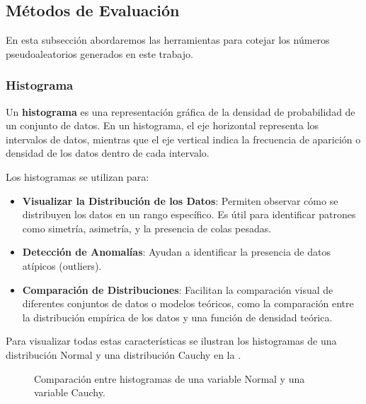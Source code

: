 \documentclass[../Main.tex]{subfiles}
\begin{document}
\subsection{Métodos de Evaluación }

En esta subsección abordaremos las herramientas para cotejar los números pseudoaleatorios generados en este trabajo.
\subsubsection{Histograma}

Un \textbf{histograma} es una representación gráfica de la densidad de probabilidad de un conjunto de datos. En un histograma, el eje horizontal representa los intervalos de datos, mientras que el eje vertical indica la frecuencia de aparición o densidad de los datos dentro de cada intervalo.

Los histogramas se utilizan para:

\begin{itemize}
    \item \textbf{Visualizar la Distribución de los Datos}: Permiten observar cómo se distribuyen los datos en un rango específico. Es útil para identificar patrones como simetría, asimetría, y la presencia de colas pesadas.
    \item \textbf{Detección de Anomalías}: Ayudan a identificar la presencia de datos atípicos (outliers).
    \item \textbf{Comparación de Distribuciones}: Facilitan la comparación visual de diferentes conjuntos de datos o modelos teóricos, como la comparación entre la distribución empírica de los datos y una función de densidad teórica.
\end{itemize}

Para visualizar todas estas características se ilustran los histogramas de una distribución Normal y una distribución Cauchy en la .
\begin{figure}[h!]
\centering
{}
\hfill
{}
\caption{Comparación entre histogramas de una variable Normal y una variable Cauchy.}
\label{fig:hist}
\end{figure}
\end{document}
